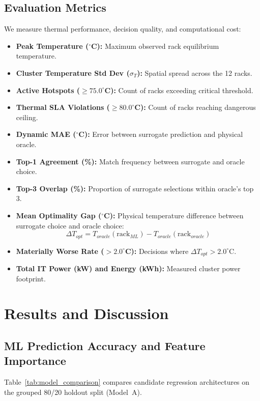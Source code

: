\documentclass[conference,10pt]{IEEEtran}
\begin{document}
\subsection{Evaluation Metrics}
We measure thermal performance, decision quality, and computational cost:
\begin{itemize}
    \item \textbf{Peak Temperature ($^\circ$C):} Maximum observed rack equilibrium temperature.
    \item \textbf{Cluster Temperature Std Dev ($\sigma_T$):} Spatial spread across the 12 racks.
    \item \textbf{Active Hotspots ($\ge 75.0^\circ$C):} Count of racks exceeding critical threshold.
    \item \textbf{Thermal SLA Violations ($\ge 80.0^\circ$C):} Count of racks reaching dangerous ceiling.
    \item \textbf{Dynamic MAE ($^\circ$C):} Error between surrogate prediction and physical oracle.
    \item \textbf{Top-1 Agreement (\%):} Match frequency between surrogate and oracle choice.
    \item \textbf{Top-3 Overlap (\%):} Proportion of surrogate selections within oracle's top 3.
    \item \textbf{Mean Optimality Gap ($^\circ$C):} Physical temperature difference between surrogate choice and oracle choice:
    \begin{equation}
    \Delta T_{opt} = T_{oracle}(\text{rack}_{ML}) - T_{oracle}(\text{rack}_{oracle})
    \end{equation}
    \item \textbf{Materially Worse Rate ($>2.0^\circ$C):} Decisions where $\Delta T_{opt} > 2.0^\circ$C.
    \item \textbf{Total IT Power (kW) and Energy (kWh):} Measured cluster power footprint.
\end{itemize}

\section{Results and Discussion}
\label{sec:results}

\subsection{ML Prediction Accuracy and Feature Importance}
Table~\ref{tab:model_comparison} compares candidate regression architectures on the grouped 80/20 holdout split (Model~A).
\end{document}
